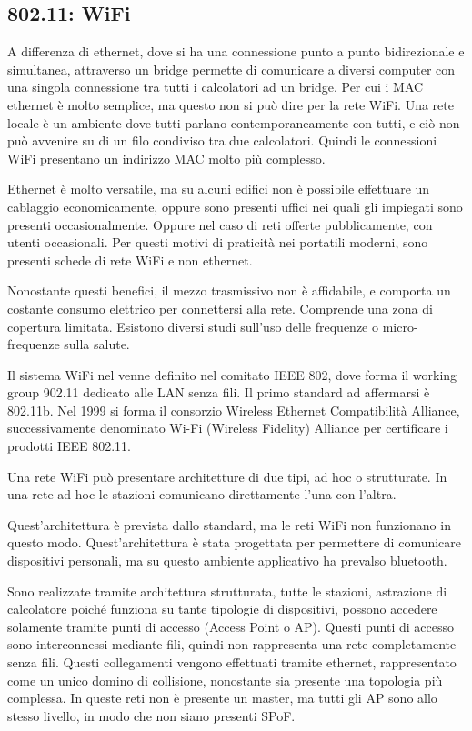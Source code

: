 \documentclass{article}
\numberwithin{equation}{subsection}
\begin{document}
\subsection{802.11: WiFi}

A differenza di ethernet, dove si ha una connessione punto a punto bidirezionale e simultanea, attraverso un bridge permette di comunicare a 
diversi computer con una singola connessione tra tutti i calcolatori ad un bridge. Per cui i MAC ethernet è molto semplice, ma questo non si 
può dire per la rete WiFi. Una rete locale è un ambiente dove tutti parlano contemporaneamente con tutti, e ciò non può avvenire su di un filo condiviso tra due 
calcolatori. Quindi le connessioni WiFi presentano un indirizzo MAC molto più complesso. 

Ethernet è molto versatile, ma su alcuni edifici non è possibile effettuare un cablaggio economicamente, oppure sono presenti uffici nei quali gli impiegati sono 
presenti occasionalmente. Oppure nel caso di reti offerte pubblicamente, con utenti occasionali. 
Per questi motivi di praticità nei portatili moderni, sono presenti schede di rete WiFi e non ethernet. 

Nonostante questi benefici, il mezzo trasmissivo non è affidabile, e comporta un costante consumo elettrico per connettersi alla rete. 
Comprende una zona di copertura limitata. Esistono diversi studi sull'uso delle frequenze o micro-frequenze sulla salute. 

Il sistema WiFi nel venne definito nel comitato IEEE 802, dove forma il working group 902.11 dedicato alle LAN senza fili. Il primo standard ad affermarsi è 802.11b. 
Nel 1999 si forma il consorzio Wireless Ethernet Compatibilità Alliance, successivamente denominato Wi-Fi (Wireless Fidelity) Alliance per certificare i prodotti 
IEEE 802.11. 


Una rete WiFi può presentare architetture di due tipi, ad hoc o strutturate. In una rete ad hoc le stazioni comunicano direttamente l'una con l'altra. 


Quest'architettura è prevista dallo standard, ma le reti WiFi non funzionano in questo modo. Quest'architettura è stata progettata per permettere di comunicare 
dispositivi personali, ma su questo ambiente applicativo ha prevalso bluetooth. 

Sono realizzate tramite architettura strutturata, tutte le stazioni, astrazione di calcolatore poiché funziona su tante tipologie di dispositivi, possono accedere 
solamente tramite punti di accesso (Access Point o AP). Questi punti di accesso sono interconnessi mediante fili, quindi non rappresenta una rete completamente senza fili. 
Questi collegamenti vengono effettuati tramite ethernet, rappresentato come un unico domino di collisione, nonostante sia presente una topologia più complessa. 
In queste reti non è presente un master, ma tutti gli AP sono allo stesso livello, in modo che non siano presenti SPoF. 
\end{document}
